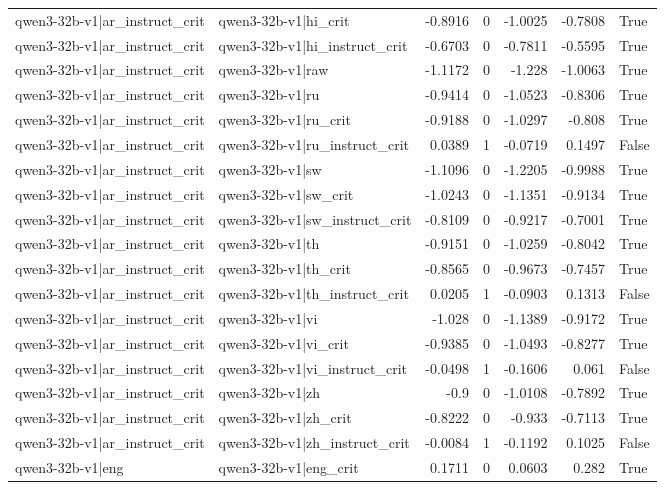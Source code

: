 \begin{table}
\begin{tabular}{l l r r r r l}
qwen3-32b-v1|ar_instruct_crit & qwen3-32b-v1|hi_crit & -0.8916 & 0 & -1.0025 & -0.7808 & True \\
qwen3-32b-v1|ar_instruct_crit & qwen3-32b-v1|hi_instruct_crit & -0.6703 & 0 & -0.7811 & -0.5595 & True \\
qwen3-32b-v1|ar_instruct_crit & qwen3-32b-v1|raw & -1.1172 & 0 & -1.228 & -1.0063 & True \\
qwen3-32b-v1|ar_instruct_crit & qwen3-32b-v1|ru & -0.9414 & 0 & -1.0523 & -0.8306 & True \\
qwen3-32b-v1|ar_instruct_crit & qwen3-32b-v1|ru_crit & -0.9188 & 0 & -1.0297 & -0.808 & True \\
qwen3-32b-v1|ar_instruct_crit & qwen3-32b-v1|ru_instruct_crit & 0.0389 & 1 & -0.0719 & 0.1497 & False \\
qwen3-32b-v1|ar_instruct_crit & qwen3-32b-v1|sw & -1.1096 & 0 & -1.2205 & -0.9988 & True \\
qwen3-32b-v1|ar_instruct_crit & qwen3-32b-v1|sw_crit & -1.0243 & 0 & -1.1351 & -0.9134 & True \\
qwen3-32b-v1|ar_instruct_crit & qwen3-32b-v1|sw_instruct_crit & -0.8109 & 0 & -0.9217 & -0.7001 & True \\
qwen3-32b-v1|ar_instruct_crit & qwen3-32b-v1|th & -0.9151 & 0 & -1.0259 & -0.8042 & True \\
qwen3-32b-v1|ar_instruct_crit & qwen3-32b-v1|th_crit & -0.8565 & 0 & -0.9673 & -0.7457 & True \\
qwen3-32b-v1|ar_instruct_crit & qwen3-32b-v1|th_instruct_crit & 0.0205 & 1 & -0.0903 & 0.1313 & False \\
qwen3-32b-v1|ar_instruct_crit & qwen3-32b-v1|vi & -1.028 & 0 & -1.1389 & -0.9172 & True \\
qwen3-32b-v1|ar_instruct_crit & qwen3-32b-v1|vi_crit & -0.9385 & 0 & -1.0493 & -0.8277 & True \\
qwen3-32b-v1|ar_instruct_crit & qwen3-32b-v1|vi_instruct_crit & -0.0498 & 1 & -0.1606 & 0.061 & False \\
qwen3-32b-v1|ar_instruct_crit & qwen3-32b-v1|zh & -0.9 & 0 & -1.0108 & -0.7892 & True \\
qwen3-32b-v1|ar_instruct_crit & qwen3-32b-v1|zh_crit & -0.8222 & 0 & -0.933 & -0.7113 & True \\
qwen3-32b-v1|ar_instruct_crit & qwen3-32b-v1|zh_instruct_crit & -0.0084 & 1 & -0.1192 & 0.1025 & False \\
qwen3-32b-v1|eng & qwen3-32b-v1|eng_crit & 0.1711 & 0 & 0.0603 & 0.282 & True \\

\end{tabular}
\end{table}
